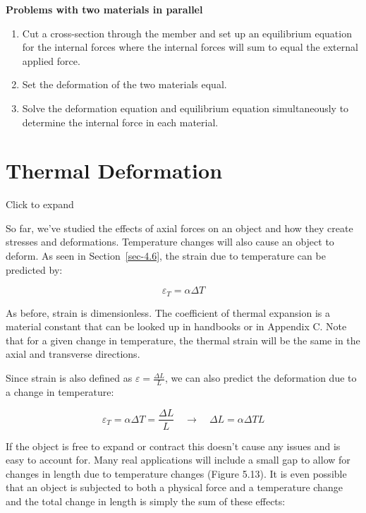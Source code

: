 \documentclass[
  letterpaper,
  DIV=11,
  numbers=noendperiod]{scrreprt}
\providecommand{\tightlist}{%
  \setlength{\itemsep}{0pt}\setlength{\parskip}{0pt}}\usepackage{longtable,booktabs,array}
\theoremstyle{definition}
\theoremstyle{remark}
\begin{document}
\begin{tcolorbox}
\textbf{Problems with two materials in parallel}

\begin{enumerate}
\def\labelenumi{\arabic{enumi}.}
\tightlist
\item
  Cut a cross-section through the member and set up an equilibrium
  equation for the internal forces where the internal forces will sum to
  equal the external applied force.
\item
  Set the deformation of the two materials equal.
\item
  Solve the deformation equation and equilibrium equation simultaneously
  to determine the internal force in each material.
\end{enumerate}

\end{tcolorbox}

\section{Thermal Deformation}\label{sec-5.6}

Click to expand

So far, we've studied the effects of axial forces on an object and how
they create stresses and deformations. Temperature changes will also
cause an object to deform. As seen in Section~\ref{sec-4.6}, the strain
due to temperature can be predicted by:

\[
\varepsilon_T=\alpha \Delta T\]

As before, strain is dimensionless. The coefficient of thermal expansion
is a material constant that can be looked up in handbooks or in Appendix
C. Note that for a given change in temperature, the thermal strain will
be the same in the axial and transverse directions.

Since strain is also defined as \(\varepsilon=\frac{\Delta L}{L}\), we
can also predict the deformation due to a change in temperature:

\[
\varepsilon_T=\alpha \Delta T=\frac{\Delta L}{L} \quad\rightarrow\quad \Delta L=\alpha \Delta T L\]

If the object is free to expand or contract this doesn't cause any
issues and is easy to account for. Many real applications will include a
small gap to allow for changes in length due to temperature changes
(Figure 5.13). It is even possible that an object is subjected to both a
physical force and a temperature change and the total change in length
is simply the sum of these effects:
\end{document}
